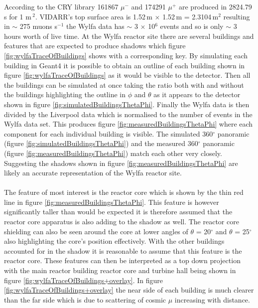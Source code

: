 \documentclass[12pt,a4paper]{article}
\begin{document}
According to the CRY library \cite{ieee_cry_2007} 161867 $\mu^-$ and 174291 $\mu^+$ are produced in 2824.79\,s for 1 m\,$^2$. VIDARR's top surface area is 1.52\,m $\times$ 1.52\,m = 2.3104\,m$^2$ resulting in $\sim$ 275 muons s$^{-1}$ the Wylfa data has $\sim$ 3 $\times$ 10$^6$ events and so is only $\sim$ 3 hours worth of live time. At the Wylfa reactor site there are several buildings and features that are expected to produce shadows which figure \ref{fig:wylfaTraceOfBuildings} shows with a corresponding key. By simulating each building in Geant4 it is possible to obtain an outline of each building shown in figure \ref{fig:wylfaTraceOfBuildings} as it would be visible to the detector. Then all the buildings can be simulated at once taking the ratio both with and without the buildings highlighting the outline in $\phi$ and $\theta$ as it appears to the detector shown in figure \ref{fig:simulatedBuildingsThetaPhi}. Finally the Wylfa data is then divided by the Liverpool data which is normalised to the number of events in the Wylfa data set. This produces figure \ref{fig:measuredBuildingsThetaPhi} where each component for each individual building is visible. The simulated 360$^\circ$ panoramic (figure \ref{fig:simulatedBuildingsThetaPhi}) and the measured 360$^\circ$ panoramic (figure \ref{fig:measuredBuildingsThetaPhi}) match each other very closely. Suggesting the shadows shown in figure \ref{fig:measuredBuildingsThetaPhi} are likely an accurate representation of the Wylfa reactor site.
\\\\The feature of most interest is the reactor core which is shown by the thin red line in figure \ref{fig:measuredBuildingsThetaPhi}. This feature is however significantly taller than would be expected it is therefore assumed that the reactor core apparatus is also adding to the shadow as well. The reactor core shielding can also be seen around the core at lower angles of $\theta$ = 20$^\circ$ and $\theta$ = 25$^\circ$ also highlighting the core's position effectively. With the other buildings accounted for in the shadow it is reasonable to assume that this feature is the reactor core. These features can then be interpreted as a top down projection with the main reactor building reactor core and turbine hall being shown in figure \ref{fig:wylfaTraceOfBuildings+overlay}. In figure \ref{fig:wylfaTraceOfBuildings+overlay} the near side of each building is much clearer than the far side which is due to scattering of cosmic $\mu$ increasing with distance. 
\end{document}
